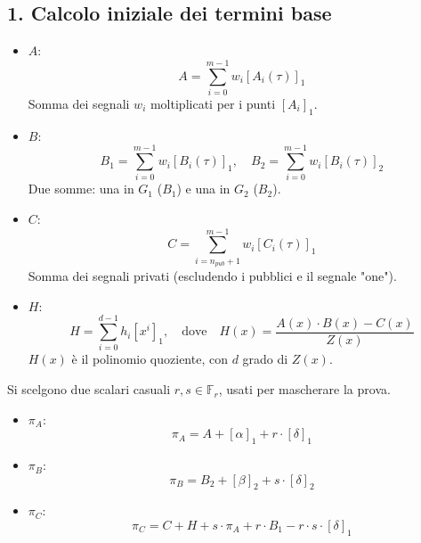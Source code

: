 \subsection*{1. Calcolo iniziale dei termini base}
\begin{itemize}
    \item \(A\):
    \begin{equation}
        A = \sum_{i=0}^{m-1} w_i [A_i(\tau)]_1
    \end{equation}
    Somma dei segnali \(w_i\) moltiplicati per i punti \([A_i]_1\).
    
    \item \(B\):
    \begin{equation}
        B_1 = \sum_{i=0}^{m-1} w_i [B_i(\tau)]_1, \quad B_2 = \sum_{i=0}^{m-1} w_i [B_i(\tau)]_2
    \end{equation}
    Due somme: una in \(G_1\) (\(B_1\)) e una in \(G_2\) (\(B_2\)).
    
    \item \(C\):
    \begin{equation}
        C = \sum_{i=n_{pub}+1}^{m-1} w_i [C_i(\tau)]_1
    \end{equation}
    Somma dei segnali privati (escludendo i pubblici e il segnale "one").
    
    \item \(H\):
    \begin{equation}
        H = \sum_{i=0}^{d-1} h_i [x^i]_1, \quad \text{dove} \quad H(x) = \frac{A(x) \cdot B(x) - C(x)}{Z(x)}
    \end{equation}
    \(H(x)\) è il polinomio quoziente, con \(d\) grado di \(Z(x)\).
\end{itemize}

Si scelgono due scalari casuali \(r, s \in \mathbb{F}_r\), usati per mascherare la prova.

\begin{itemize}
    \item \(\pi_A\):
    \begin{equation}
        \pi_A = A + [\alpha]_1 + r \cdot [\delta]_1
    \end{equation}
    
    \item \(\pi_B\):
    \begin{equation}
        \pi_B = B_2 + [\beta]_2 + s \cdot [\delta]_2
    \end{equation}
    
    \item \(\pi_C\):
    \begin{equation}
        \pi_C = C + H + s \cdot \pi_A + r \cdot B_1 - r \cdot s \cdot [\delta]_1
    \end{equation}
\end{itemize}


